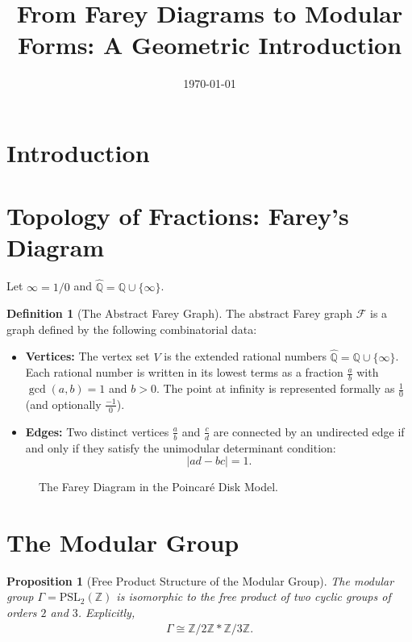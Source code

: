\documentclass[11pt, a4paper]{article}
\title{From Farey Diagrams to Modular Forms: A Geometric Introduction}
\author{}
\date{\today}
\newcommand{\Q}{\mathbb{Q}}
\theoremstyle{plain}
\newtheorem{proposition}[theorem]{Proposition}
\theoremstyle{definition}
\newtheorem{definition}[theorem]{Definition}
\theoremstyle{remark}
\begin{document}
\maketitle
\section{Introduction}
\newpage 

\section{Topology of Fractions: Farey's Diagram}
Let $\infty = 1/0$ and $\hat{\Q}=\Q \cup \{\infty\}$.

\begin{definition}[The Abstract Farey Graph]
The abstract Farey graph $\mathcal{F}$ is a graph defined by the following combinatorial data:
\begin{itemize}
    \item \textbf{Vertices:} The vertex set $V$ is the extended rational numbers $\hat{\Q} = \Q \cup \{\infty\}$. Each rational number is written in its lowest terms as a fraction $\frac{a}{b}$ with $\gcd(a,b)=1$ and $b>0$. The point at infinity is represented formally as $\frac{1}{0}$ (and optionally $\frac{-1}{0}$).
    \item \textbf{Edges:} Two distinct vertices $\frac{a}{b}$ and $\frac{c}{d}$ are connected by an undirected edge if and only if they satisfy the unimodular determinant condition:
    $$|ad - bc| = 1.$$
\end{itemize}
\end{definition}
\begin{figure}[htbp]
    \centering
    \caption{The Farey Diagram in the Poincaré Disk Model.}
    \label{fig:farey_disk}
\end{figure}
\section{The Modular Group}
\begin{proposition}[Free Product Structure of the Modular Group]
    The modular group $\Gamma = \mathrm{PSL}_2(\mathbb{Z})$ is isomorphic to the free product of two cyclic groups of orders $2$ and $3$. Explicitly,
    \begin{align*}
        \Gamma \cong \mathbb{Z}/2\mathbb{Z} * \mathbb{Z}/3\mathbb{Z}.
    \end{align*}
\end{proposition}
\end{document}
